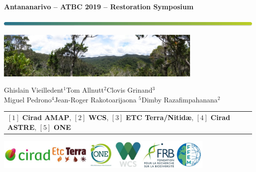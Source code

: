 
{
  \begin{frame}
  \begin{center}
  \small{\textbf{Antananarivo -- ATBC 2019 -- Restoration Symposium}}
  \end{center}
  \vspace{-0.5cm}
  \titlepage %
  \vspace{-3cm}
  \begin{center}
    \includegraphics[width=\textwidth]{figs/Barre_couleur}
    
    \vspace{0.25cm}
    
    \includegraphics[width=10cm]{figs/Banniere}
    
    \small{Ghislain Vieilledent$^{1}$\hspace{0.5cm}Tom Allnutt$^{2}$\hspace{0.5cm}Clovis
      Grinand$^{3}$\\Miguel Pedrono$^{4}$\hspace{0.5cm}Jean-Roger Rakotoarijaona
      $^{5}$\hspace{0.5cm}Dimby Razafimpahanana$^{2}$}
      
    \vspace{0.25cm}
    
    {\scriptsize
      \begin{tabular}{l}
        $[1]$ \textbf{Cirad AMAP}, $[2]$ \textbf{WCS}, $[3]$ \textbf{ETC Terra/Nitid\ae}, $[4]$
        \textbf{Cirad ASTRE}, $[5]$ \textbf{ONE}  
      \end{tabular}
    }
    
    \includegraphics[width=0.8\textwidth]{figs/partners_logos}
    
  \end{center}
  \end{frame}
}

